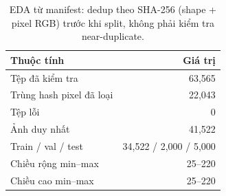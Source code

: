 \begin{table}[htbp]
\centering\small
\caption{EDA từ manifest: dedup theo SHA-256 (shape + pixel RGB) trước khi split, không phải kiểm tra near-duplicate.}\label{tab:A2eda}
\begin{lrbox}{\reporttable}\begin{tabular}{lr}
\toprule
Thuộc tính & Giá trị \\
\midrule
Tệp đã kiểm tra & 63,565 \\
Trùng hash pixel đã loại & 22,043 \\
Tệp lỗi & 0 \\
Ảnh duy nhất & 41,522 \\
Train / val / test & 34,522 / 2,000 / 5,000 \\
Chiều rộng min--max & 25--220 \\
Chiều cao min--max & 25--220 \\
\bottomrule
\end{tabular}\end{lrbox}
\ifdim\wd\reporttable>\linewidth\resizebox{\linewidth}{!}{\usebox{\reporttable}}\else\usebox{\reporttable}\fi
\end{table}
